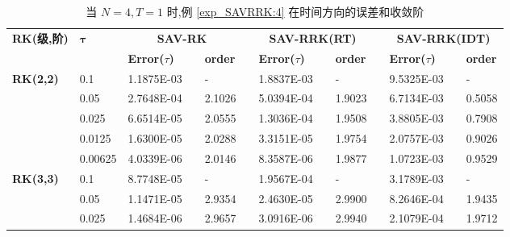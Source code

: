 \documentclass[aspectratio=169]{beamer}
\numberwithin{theorem}{section} %
\begin{document}
\begin{frame}%
	\begin{table}[H]\scriptsize
		\centering
		\caption{当 $N=4, T = 1$ 时,例 \ref{exp_SAVRRK:4} 在时间方向的误差和收敛阶}
		\begin{tabular}{lllllrlrlrlrlrl}
		\toprule
		\multicolumn{2}{l}{\multirow{2}[3]{*}{\textbf{RK(级,阶)}}} & \multicolumn{2}{l}{\multirow{2}[3]{*}{$\bm{\tau}$}} & \multicolumn{3}{c}{\textbf{SAV-RK}} &       & \multicolumn{3}{c}{\textbf{SAV-RRK(RT)}} &       & \multicolumn{3}{c}{\textbf{SAV-RRK(IDT)}} \\
		\cmidrule{5-7}\cmidrule{9-11}\cmidrule{13-15}    \multicolumn{2}{l}{} & \multicolumn{2}{l}{} & \textbf{Error($\tau$)} &       & \textbf{order} &       & \textbf{Error($\tau$)} &       & \textbf{order} &       & \textbf{Error($\tau$)} &       & \textbf{order} \\
		\hline
		\multicolumn{2}{l}{\multirow{5}[0]{*}{\textbf{RK(2,2)}}} & \multicolumn{2}{l}{0.1} & 1.1875E-03 &       & -     &       & 1.8837E-03 &       & -     &       & 9.5325E-03 &       & - \\
		\multicolumn{2}{l}{} & \multicolumn{2}{l}{0.05} & 2.7648E-04 &       & 2.1026  &       & 5.0394E-04 &       & 1.9023  &       & 6.7134E-03 &       & 0.5058  \\
		\multicolumn{2}{l}{} & \multicolumn{2}{l}{0.025} & 6.6514E-05 &       & 2.0555  &       & 1.3036E-04 &       & 1.9508  &       & 3.8805E-03 &       & 0.7908  \\
		\multicolumn{2}{l}{} & \multicolumn{2}{l}{0.0125} & 1.6300E-05 &       & 2.0288  &       & 3.3151E-05 &       & 1.9754  &       & 2.0757E-03 &       & 0.9026  \\
		\multicolumn{2}{l}{} & \multicolumn{2}{l}{0.00625} & 4.0339E-06 &       & 2.0146  &       & 8.3587E-06 &       & 1.9877  &       & 1.0723E-03 &       & 0.9529  \\
		\multicolumn{2}{l}{\multirow{5}[0]{*}{\textbf{RK(3,3)}}} & \multicolumn{2}{l}{0.1} & 8.7748E-05 &       & -     &       & 1.9567E-04 &       & -     &       & 3.1789E-03 &       & - \\
		\multicolumn{2}{l}{} & \multicolumn{2}{l}{0.05} & 1.1471E-05 &       & 2.9354  &       & 2.4630E-05 &       & 2.9900  &       & 8.2646E-04 &       & 1.9435  \\
		\multicolumn{2}{l}{} & \multicolumn{2}{l}{0.025} & 1.4684E-06 &       & 2.9657  &       & 3.0916E-06 &       & 2.9940  &       & 2.1079E-04 &       & 1.9712  \\

\end{tabular}
\end{table}
\end{frame}
\end{document}
